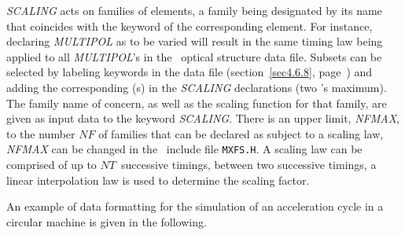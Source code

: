 \noindent\textsl{SCALING} acts on families of elements,  a family being
designated by its name that  coincides with 
the keyword of the corresponding element. For instance, declaring \textsl{MULTIPOL} 
as to be varied will result in the same timing law being applied to all 
\textsl{MULTIPOL}'s in the \zgou\ optical structure data file. Subsets can be selected by 
labeling keywords in the data file (section~\ref{sec4.6.8}, page~\pageref{sec4.6.8}) 
and adding the corresponding \LABEL(s) 
in the \textsl{SCALING} declarations (two \LABEL's maximum). The family name of concern, 
as well as the scaling function for  that  family,  are given as
input data to the keyword \textsl{SCALING}. There is an upper limit, \textsl{NFMAX}, to the number  $NF$ 
of families that can be declared
as subject to a scaling law,  \textsl{NFMAX} can be changed in the \FORTRAN\ include file \texttt{MXFS.H}. 
A scaling law can be comprised  of up to $NT$~successive timings,  
between two successive timings, a linear interpolation law is used to determine the scaling factor. 

\bigskip

\noindent An example of data formatting for the simulation of an acceleration cycle in a circular 
machine is given in the following. 

\bigskip

